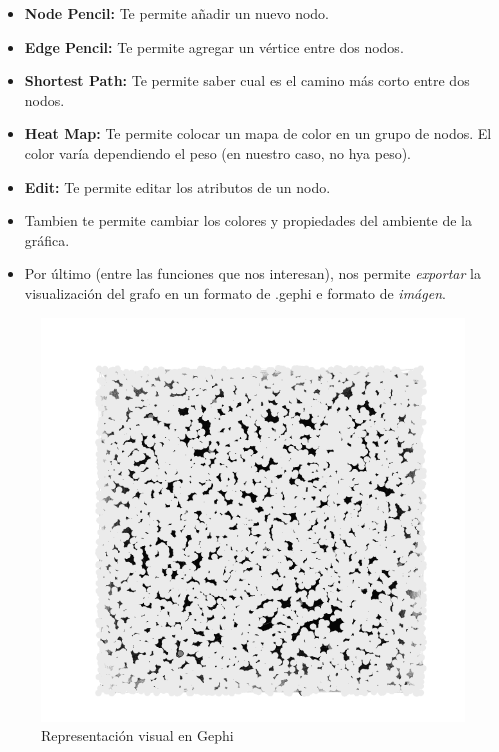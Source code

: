 \documentclass[acmlarge,screen]{acmart}
\begin{document}
\begin{enumerate}
\begin{itemize}
  \item {\bf Node Pencil:} Te permite añadir un nuevo nodo.
  \item {\bf Edge Pencil:} Te permite agregar un vértice entre dos nodos.
  \item {\bf Shortest Path:} Te permite saber cual es el camino más corto entre dos nodos.
  \item {\bf Heat Map:} Te permite colocar un mapa de color en un grupo de nodos. El color varía dependiendo el peso (en nuestro caso, no hya peso).
  \item {\bf Edit:} Te permite editar los atributos de un nodo.
  \item Tambien te permite cambiar los colores y propiedades del ambiente de la gráfica.
  \item Por último (entre las funciones que nos interesan), nos permite {\it exportar} la visualización del grafo en un formato de .gephi e formato de {\it imágen}.
 \end{itemize}
\end{enumerate}

\begin{figure}[h!]
 \includegraphics[scale=0.5]{Gephi_GML.png}
 \caption{Representación visual en Gephi}
 \label{fig:gephi}
\end{figure}
\end{document}
